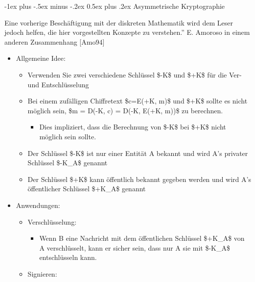 \documentclass[a4paper]{article}
\makeatletter
\renewcommand{\section}{\@startsection{section}{1}{0mm}%
 {-1ex plus -.5ex minus -.2ex}%
 {0.5ex plus .2ex}%
 {\normalfont\large\bfseries}}
\makeatother
\begin{document}
\begin{multicols}{3}
    \section{Asymmetrische
      Kryptographie}

    Eine vorherige Beschäftigung mit der diskreten Mathematik wird dem Leser
    jedoch helfen, die hier vorgestellten Konzepte zu verstehen.'' E.
    Amoroso in einem anderen Zusammenhang {[}Amo94{]}

    \begin{itemize}
        \item
              Allgemeine Idee:

              \begin{itemize}
                  \item
                        Verwenden Sie zwei verschiedene Schlüssel \$-K\$ und \$+K\$ für die
                        Ver- und Entschlüsselung
                  \item
                        Bei einem zufälligen Chiffretext \$c=E(+K, m)\$ und \$+K\$ sollte es
                        nicht möglich sein, \$m = D(-K, c) = D(-K, E(+K, m))\$ zu berechnen.

                        \begin{itemize}
                            \item
                                  Dies impliziert, dass die Berechnung von \$-K\$ bei \$+K\$ nicht
                                  möglich sein sollte.
                        \end{itemize}
                  \item
                        Der Schlüssel \$-K\$ ist nur einer Entität A bekannt und wird A's
                        privater Schlüssel \$-K\_A\$ genannt
                  \item
                        Der Schlüssel \$+K\$ kann öffentlich bekannt gegeben werden und wird
                        A's öffentlicher Schlüssel \$+K\_A\$ genannt
              \end{itemize}
        \item
              Anwendungen:

              \begin{itemize}
                  \item
                        Verschlüsselung:

                        \begin{itemize}
                            \item
                                  Wenn B eine Nachricht mit dem öffentlichen Schlüssel \$+K\_A\$ von
                                  A verschlüsselt, kann er sicher sein, dass nur A sie mit \$-K\_A\$
                                  entschlüsseln kann.
                        \end{itemize}
                  \item
                        Signieren:


\end{itemize}
\end{itemize}
\end{multicols}
\end{document}
